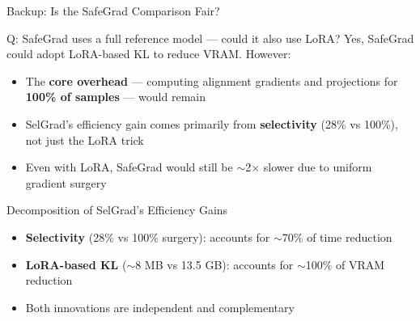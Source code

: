 \documentclass[aspectratio=169, 11pt]{beamer}
\begin{document}
\begin{frame}{Backup: Is the SafeGrad Comparison Fair?}
\vspace{8pt}
\begin{block}{Q: SafeGrad uses a full reference model --- could it also use LoRA?}
\small
Yes, SafeGrad could adopt LoRA-based KL to reduce VRAM. However:
\begin{itemize}
  \item The \textbf{core overhead} --- computing alignment gradients and projections for \textbf{100\% of samples} --- would remain
  \item SelGrad's efficiency gain comes primarily from \textbf{selectivity} (28\% vs 100\%), not just the LoRA trick
  \item Even with LoRA, SafeGrad would still be $\sim$2$\times$ slower due to uniform gradient surgery
\end{itemize}
\end{block}

\vspace{8pt}
\begin{exampleblock}{Decomposition of SelGrad's Efficiency Gains}
\small
\begin{itemize}
  \item \textbf{Selectivity} (28\% vs 100\% surgery): accounts for $\sim$70\% of time reduction
  \item \textbf{LoRA-based KL} ($\sim$8 MB vs 13.5 GB): accounts for $\sim$100\% of VRAM reduction
  \item Both innovations are independent and complementary
\end{itemize}
\end{exampleblock}
\end{frame}

\setcounter{framenumber}{\value{backupslide}}
\end{document}
